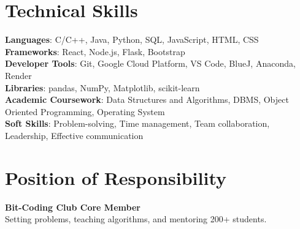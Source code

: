 \documentclass[letterpaper,11pt]{article}
\begin{document}
\section{Technical Skills}
 \begin{itemize}[leftmargin=0.15in, label={}]
    \small{\item{
     \textbf{Languages}{: C/C++, Java, Python, SQL, JavaScript, HTML, CSS} \\
     \textbf{Frameworks}{: React, Node.js, Flask, Bootstrap} \\
     \textbf{Developer Tools}{: Git, Google Cloud Platform, VS Code, BlueJ, Anaconda, Render} \\
     \textbf{Libraries}{: pandas, NumPy, Matplotlib, scikit-learn} \\
     \textbf{Academic Coursework}{: Data Structures and Algorithms, DBMS, Object Oriented Programming, Operating System} \\
     \textbf{Soft Skills}{: Problem-solving, Time management, Team collaboration, Leadership, Effective communication}
    }}
 \end{itemize}

\section{Position of Responsibility}
 \begin{itemize}[leftmargin=0.15in, label={}]
    \small{\item{
     \textbf{Bit-Coding Club Core Member} \\
     {Setting problems, teaching algorithms, and mentoring 200+ students.}
    }}
 \end{itemize}
\end{document}
